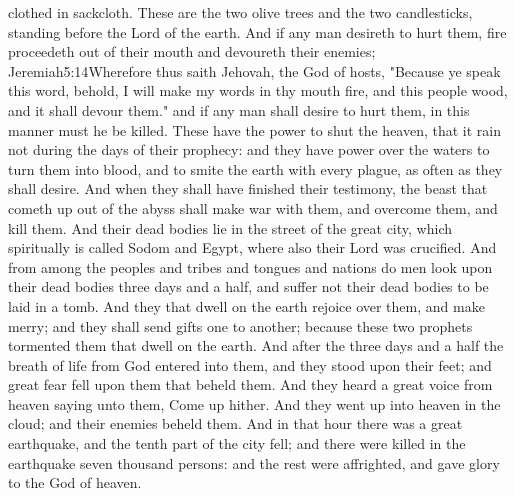  clothed in sackcloth. 
 These are the two olive trees and the two candlesticks, standing before the Lord of the earth.%
 And if any man desireth to hurt them, fire proceedeth out of their mouth and devoureth their enemies;%
					{Jeremiah}{5:14}{Wherefore thus saith Jehovah, the God of hosts, "Because ye speak this word, behold, I will make my words in thy mouth fire, and this people wood, and it shall devour them."}
 and if any man shall desire to hurt them, in this manner must he be killed. 
 These have the power to shut the heaven, that it rain not during the days of their prophecy: and they have power over the waters to turn them into blood, and to smite the earth with every plague, as often as they shall desire. 
 And when they shall have finished their testimony, the beast that cometh up out of the abyss shall make war with them, and overcome them, and kill them. 
 And their dead bodies lie in the street of the great city, which spiritually is called Sodom and Egypt, where also their Lord was crucified. 
 And from among the peoples and tribes and tongues and nations do men look upon their dead bodies three days and a half, and suffer not their dead bodies to be laid in a tomb. 
 And they that dwell on the earth rejoice over them, and make merry; and they shall send gifts one to another; because these two prophets tormented them that dwell on the earth. 
 And after the three days and a half the breath of life from God entered into them, and they stood upon their feet; and great fear fell upon them that beheld them. 
 And they heard a great voice from heaven saying unto them, Come up hither. And they went up into heaven in the cloud; and their enemies beheld them. 
 And in that hour there was a great earthquake, and the tenth part of the city fell; and there were killed in the earthquake seven thousand persons: and the rest were affrighted, and gave glory to the God of heaven.

